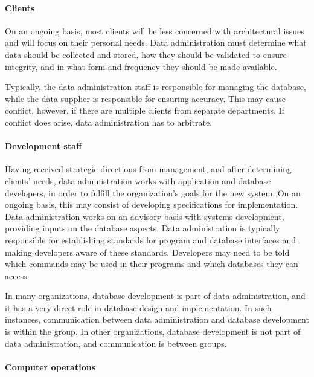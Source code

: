 \documentclass[
]{article}
\begin{document}
\hypertarget{clients}{%
\paragraph*{Clients}\label{clients}}

On an ongoing basis, most clients will be less concerned with
architectural issues and will focus on their personal needs. Data
administration must determine what data should be collected and stored,
how they should be validated to ensure integrity, and in what form and
frequency they should be made available.

Typically, the data administration staff is responsible for managing the
database, while the data supplier is responsible for ensuring accuracy.
This may cause conflict, however, if there are multiple clients from
separate departments. If conflict does arise, data administration has to
arbitrate.

\hypertarget{development-staff}{%
\paragraph*{Development staff}\label{development-staff}}

Having received strategic directions from management, and after
determining clients' needs, data administration works with application
and database developers, in order to fulfill the organization's goals
for the new system. On an ongoing basis, this may consist of developing
specifications for implementation. Data administration works on an
advisory basis with systems development, providing inputs on the
database aspects. Data administration is typically responsible for
establishing standards for program and database interfaces and making
developers aware of these standards. Developers may need to be told
which commands may be used in their programs and which databases they
can access.

In many organizations, database development is part of data
administration, and it has a very direct role in database design and
implementation. In such instances, communication between data
administration and database development is within the group. In other
organizations, database development is not part of data administration,
and communication is between groups.

\hypertarget{computer-operations}{%
\paragraph*{Computer operations}\label{computer-operations}}
\end{document}
